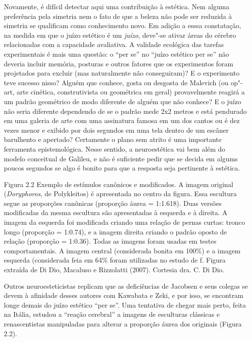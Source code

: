 Novamente, é difícil detectar aqui uma contribuição à estética. Nem
alguma preferência pela simetria nem o fato de que a beleza não pode ser
reduzida à simetria se qualificam como conhecimento novo. Em adição a
esssa constatação, na medida em que o juízo estético é um \emph{juízo},
deve"-se ativar áreas do cérebro relacionadas com a capacidade
avaliativa. A validade ecológica das tarefas experimentais é mais uma
questão: o ``per se'' no ``juízo estético per se'' não deveria incluir
memória, posturas e outros fatores que os experimentos foram projetados
para excluir (mas naturalmente não conseguiram)? E o experimento teve
sucesso nisso? Alguém que conhece, gosta ou desgosta de Malevich (ou
op"-art, arte cinética, construtivista ou geométrica em geral)
provavelmente reagirá a um padrão geométrico de modo diferente de alguém
que não conhece? E o juízo não seria diferente dependendo de se o padrão
mede 2x2 metros e está pendurado em uma galeria de arte com uma
assinatura famosa em um dos cantos ou é dez vezes menor e exibido por
dois segundos em uma tela dentro de um escâner barulhento e apertado?
Certamente o plano sem atrito é uma importante ferramenta
epistemológica. Nesse sentido, a neuroestética vai bem além do modelo
conceitual de Galileu, e não é suficiente pedir que se decida em algums
poucos segundos se algo é bonito para que a resposta seja pertinente à
estética.


Figura 2.2 Exemplo de estímulos canônicos e modificados. A imagem
original (\emph{Doryphoros}, de Polykleitos) é apresentada no centro da
figura. Essa escultura segue as proporções canônicas (proporção áurea =
1:1.618). Duas versões modificadas da mesma escultura são apresentadas à
esquerda e à direita. A imagem da esquerda foi modificada criando uma
relação de pernas curtas: tronco longo (proporção = 1:0.74), e a imagem
direita criando o padrão oposto de relação (proporção = 1:0.36). Todas
as imagens foram usadas em testes comportamentais. A imagem central
(considerada bonita em 100\%) e a imagem esquerda (considerada feia em
64\% foram utilizadas no estudo de f. Figura extraída de Di Dio,
Macaluso e Rizzolatti (2007). Cortesia dra. C. Di Dio.

Outros neuroesteticistas replicam que as deficiências de Jacobsen e seus
colegas se devem à afinidade desses autores com Kawabata e Zeki, e por
isso, se encontram longe demais do juízo estético ``per se''. Uma
tentativa de chegar mais perto, feita na Itália, estudou a ``reação
cerebral'' a imagens de esculturas clássicas e renascentistas
manipuladas para alterar a proporção áurea dos originais (Figura 2.2).

